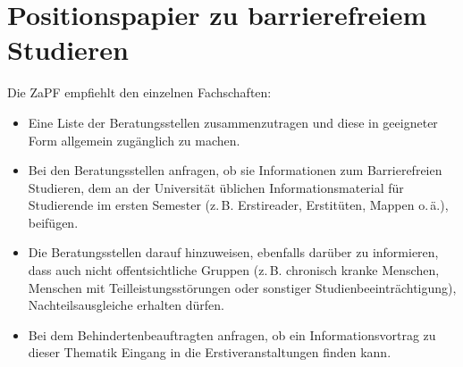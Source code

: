 \section{Positionspapier zu barrierefreiem Studieren}
Die ZaPF empfiehlt den einzelnen Fachschaften:
\begin{itemize}
\item Eine Liste der Beratungsstellen zusammenzutragen und diese in geeigneter
	Form allgemein zugänglich zu machen. 
\item Bei den Beratungsstellen anfragen, ob sie Informationen zum
	Barrierefreien Studieren, dem an der Universität üblichen
	Informationsmaterial für Studierende im ersten Semester (z.\,B.
	Erstireader, Erstitüten, Mappen o.\,ä.), beifügen.
\item Die Beratungsstellen darauf hinzuweisen, ebenfalls darüber zu
	informieren, dass auch nicht offentsichtliche Gruppen (z.\,B. chronisch
	kranke Menschen, Menschen mit Teilleistungsstörungen oder sonstiger
	Studienbeeinträchtigung), Nachteilsausgleiche erhalten dürfen.
\item Bei dem Behindertenbeauftragten anfragen, ob ein Informationsvortrag zu
	dieser Thematik Eingang in die Erstiveranstaltungen finden kann.
\end{itemize}
